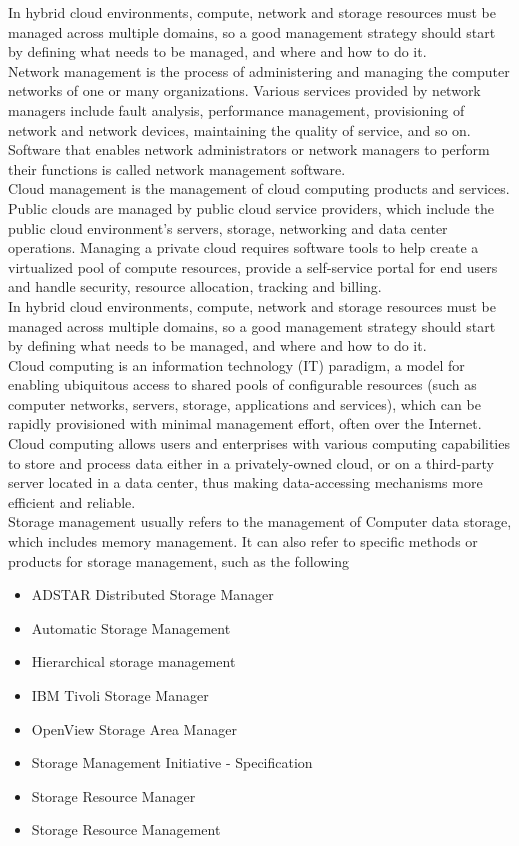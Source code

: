 \documentclass[a4paper,12pt]{report}
\begin{document}
In hybrid cloud environments, compute, network and storage resources must be managed across multiple domains, so a good management strategy should start by defining what needs to be managed, and where and how to do it.\\

Network management is the process of administering and managing the computer networks of one or many organizations. Various services provided by network managers include fault analysis, performance management, provisioning of network and network devices, maintaining the quality of service, and so on. Software that enables network administrators or network managers to perform their functions is called network management software.\\

Cloud management is the management of cloud computing products and services. Public clouds are managed by public cloud service providers, which include the public cloud environment’s servers, storage, networking and data center operations. Managing a private cloud requires software tools to help create a virtualized pool of compute resources, provide a self-service portal for end users and handle security, resource allocation, tracking and billing.\\

In hybrid cloud environments, compute, network and storage resources must be managed across multiple domains, so a good management strategy should start by defining what needs to be managed, and where and how to do it.\\

Cloud computing is an information technology (IT) paradigm, a model for enabling ubiquitous access to shared pools of configurable resources (such as computer networks, servers, storage, applications and services), which can be rapidly provisioned with minimal management effort, often over the Internet. Cloud computing allows users and enterprises with various computing capabilities to store and process data either in a privately-owned cloud, or on a third-party server located in a data center, thus making data-accessing mechanisms more efficient and reliable.\\

Storage management usually refers to the management of Computer data storage, which includes memory management. It can also refer to specific methods or products for storage management, such as the following
\begin{itemize}
	\item ADSTAR Distributed Storage Manager
	\item Automatic Storage Management
	\item Hierarchical storage management
	\item IBM Tivoli Storage Manager
	\item OpenView Storage Area Manager
	\item Storage Management Initiative - Specification
	\item Storage Resource Manager
	\item Storage Resource Management
\end{itemize}
\end{document}

